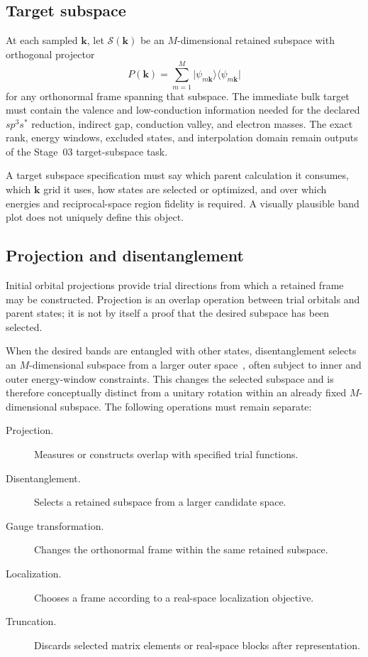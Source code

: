 \subsection{Target subspace}


At each sampled $\mathbf k$, let $\mathcal S(\mathbf k)$ be an
$M$-dimensional retained subspace with orthogonal projector
\begin{equation}
  P(\mathbf k)
  =
  \sum_{m=1}^{M}
  \lvert\psi_{m\mathbf k}\rangle
  \langle\psi_{m\mathbf k}\rvert
\end{equation}
for any orthonormal frame spanning that subspace. The immediate bulk target must
contain the valence and low-conduction information needed for the declared
$sp^3s^{\ast}$ reduction, indirect gap, conduction valley, and electron masses.
The exact rank, energy windows, excluded states, and interpolation domain remain
outputs of the Stage~03 target-subspace task.

A target subspace specification must say which parent calculation it consumes,
which $\mathbf k$ grid it uses, how states are selected or optimized, and over
which energies and reciprocal-space region fidelity is required. A visually
plausible band plot does not uniquely define this object.

\subsection{Projection and disentanglement}


Initial orbital projections provide trial directions from which a retained
frame may be constructed. Projection is an overlap operation between trial
orbitals and parent states; it is not by itself a proof that the desired
subspace has been selected.

When the desired bands are entangled with other states, disentanglement selects
an $M$-dimensional subspace from a larger outer space~\cite{souza2001}, often
subject to inner
and outer energy-window constraints. This changes the selected subspace and is
therefore conceptually distinct from a unitary rotation within an already fixed
$M$-dimensional subspace. The following operations must remain separate:

\begin{description}
  \item[Projection.] Measures or constructs overlap with specified trial
    functions.
  \item[Disentanglement.] Selects a retained subspace from a larger candidate
    space.
  \item[Gauge transformation.] Changes the orthonormal frame within the same
    retained subspace.
  \item[Localization.] Chooses a frame according to a real-space localization
    objective.
  \item[Truncation.] Discards selected matrix elements or real-space blocks
    after representation.
\end{description}

